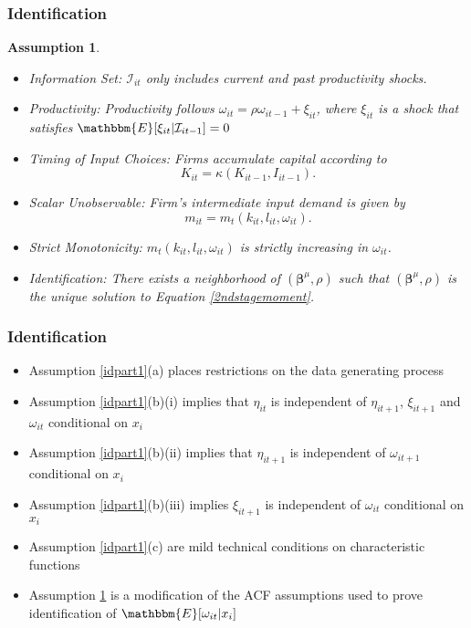 \documentclass[xcolor={dvipsnames}, notheorems]{beamer}
\theoremstyle{plain}
\newtheorem{assump}{Assumption}
\begin{document}
\begin{frame}
\frametitle{Identification}
\small
\begin{assump}\label{idpart2}
\begin{itemize}
    \item Information Set: $\mathcal{I}_{it}$ only includes current and past productivity shocks.
    \item Productivity: Productivity follows $\omega_{it}=\rho\omega_{it-1}+\xi_{it}$, where $\xi_{it}$ is a shock that satisfies $\mathbbm{E}[\xi_{it}|\mathcal{I}_{it-1}]=0$
    \item Timing of  Input Choices: Firms accumulate capital according to
    \begin{equation*}
    K_{it}=\kappa(K_{it-1}, I_{it-1}).
    \end{equation*}
    \item Scalar Unobservable: Firm's intermediate input demand is given by
    \begin{equation*}
    m_{it}=m_{t}(k_{it}, l_{it}, \omega_{it}).
    \end{equation*}
    \item Strict Monotonicity: $m_{t}(k_{it}, l_{it}, \omega_{it})$ is strictly increasing in $\omega_{it}$.
    \item Identification: There exists a neighborhood of $(\boldsymbol{\beta}^{\mu}, \rho)$ such that  $(\boldsymbol{\beta}^{\mu}, \rho)$ is the unique solution to Equation \eqref{2ndstagemoment}.
\end{itemize}
\end{assump}
\end{frame}


\begin{frame}
\frametitle{Identification}
\begin{itemize}
\item Assumption \ref{idpart1}(a) places restrictions on the data generating process
\item Assumption \ref{idpart1}(b)(i) implies that $\eta_{it}$ is independent of $\eta_{it+1}$, $\xi_{it+1}$ and $\omega_{it}$ conditional on $x_{i}$
\item Assumption \ref{idpart1}(b)(ii) implies that $\eta_{it+1}$ is independent of $\omega_{it+1}$ conditional on $x_{i}$
\item Assumption \ref{idpart1}(b)(iii) implies $\xi_{it+1}$ is independent of $\omega_{it}$ conditional on $x_{i}$
\item Assumption \ref{idpart1}(c) are mild technical conditions on characteristic functions
\item Assumption \ref{idpart2} is a modification of the ACF assumptions used to prove identification of $\mathbbm{E}[\omega_{it}|x_{i}]$
\end{itemize}
\end{frame}
\end{document}
